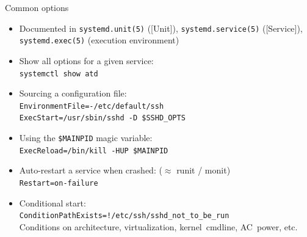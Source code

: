 \documentclass[11pt,final,usepdftitle=false]{beamer}
\begin{document}
\begin{frame}[fragile]{Common options}
\hbr
\begin{itemize}
	\item \alert{Documented in \texttt{systemd.unit(5)}} ([Unit]), \alert{\texttt{systemd.service(5)}} ([Service]), \alert{\texttt{systemd.exec(5)}} (execution environment)
\hbr
\item \alert{Show all options} for a given service:\\
	\alert{\texttt{systemctl show atd}}
\hbr
	\item Sourcing a configuration file:\\
\texttt{EnvironmentFile=-/etc/default/ssh}\\
\texttt{ExecStart=/usr/sbin/sshd -D \$SSHD\_OPTS}
\hbr
\item Using the \texttt{\$MAINPID} magic variable:\\
\texttt{ExecReload=/bin/kill -HUP \$MAINPID}
\hbr
\item Auto-restart a service when crashed: ($\approx$ runit / monit)\\
\texttt{Restart=on-failure}
\hbr
\item Conditional start:\\
\texttt{ConditionPathExists=!/etc/ssh/sshd\_not\_to\_be\_run}\\
{\small Conditions on architecture, virtualization, kernel~cmdline, AC~power, etc.}
\end{itemize}
\end{frame}
\end{document}
